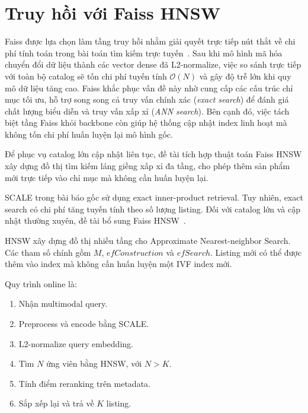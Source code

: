 \documentclass[10pt,conference]{IEEEtran}
\begin{document}
\section{Truy hồi với Faiss HNSW}

Faiss được lựa chọn làm tầng truy hồi nhằm giải quyết trực tiếp nút thắt về chi phí tính toán trong bài toán tìm kiếm trực tuyến~\cite{johnson2019faiss}. Sau khi mô hình mã hóa chuyển đổi dữ liệu thành các vector dense đã L2-normalize, việc so sánh trực tiếp với toàn bộ catalog sẽ tốn chi phí tuyến tính $\mathcal{O}(N)$ và gây độ trễ lớn khi quy mô dữ liệu tăng cao. Faiss khắc phục vấn đề này nhờ cung cấp các cấu trúc chỉ mục tối ưu, hỗ trợ song song cả truy vấn chính xác (\textit{exact search}) để đánh giá chất lượng biểu diễn và truy vấn xấp xỉ (\textit{ANN search}). Bên cạnh đó, việc tách biệt tầng Faiss khỏi backbone còn giúp hệ thống cập nhật index linh hoạt mà không tốn chi phí huấn luyện lại mô hình gốc.

Để phục vụ catalog lớn cập nhật liên tục, đề tài tích hợp thuật toán Faiss HNSW xây dựng đồ thị tìm kiếm láng giềng xấp xỉ đa tầng, cho phép thêm sản phẩm mới trực tiếp vào chỉ mục mà không cần huấn luyện lại.

SCALE trong bài báo gốc sử dụng exact inner-product retrieval. Tuy nhiên, exact search có chi phí tăng tuyến tính theo số lượng listing. Đối với catalog lớn và cập nhật thường xuyên, đề tài bổ sung Faiss HNSW~\cite{malkov2020hnsw,johnson2019faiss}.

HNSW xây dựng đồ thị nhiều tầng cho Approximate Nearest-neighbor Search. Các tham số chính gồm $M$, $efConstruction$ và $efSearch$. Listing mới có thể được thêm vào index mà không cần huấn luyện một IVF index mới.

Quy trình online là:
\begin{enumerate}[leftmargin=*]
    \item Nhận multimodal query.
    \item Preprocess và encode bằng SCALE.
    \item L2-normalize query embedding.
    \item Tìm $N$ ứng viên bằng HNSW, với $N>K$.
    \item Tính điểm reranking trên metadata.
    \item Sắp xếp lại và trả về $K$ listing.
\end{enumerate}
\end{document}
